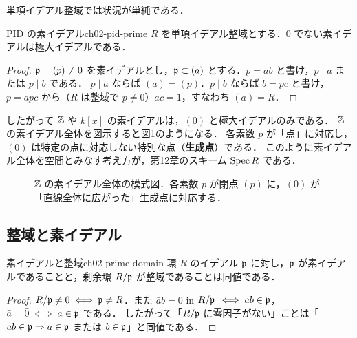 単項イデアル整域では状況が単純である．

\begin{myprop}{PID の素イデアル}{ch02-pid-prime}
$R$ を単項イデアル整域とする．$0$ でない素イデアルは極大イデアルである．
\end{myprop}

\begin{proof}
$\mathfrak{p}=(p)\ne0$ を素イデアルとし，$\mathfrak{p}\subset(a)$ とする．$p=ab$ と書け，$p\mid a$ または $p\mid b$ である．
$p\mid a$ ならば $(a)=(p)$．$p\mid b$ ならば $b=pc$ と書け，$p=apc$ から（$R$ は整域で $p\ne0$）$ac=1$，すなわち $(a)=R$．
\end{proof}

したがって $\mathbb{Z}$ や $k[x]$ の素イデアルは，$(0)$ と極大イデアルのみである．
$\mathbb{Z}$ の素イデアル全体を図示すると図\ref{fig:ch02-specz}のようになる．
各素数 $p$ が「点」に対応し，$(0)$ は特定の点に対応しない特別な点（\textbf{生成点}）である．
このように素イデアル全体を空間とみなす考え方が，第12章のスキーム $\operatorname{Spec} R$ である．

\begin{figure}[H]
\centering
{}
\caption{$\mathbb{Z}$ の素イデアル全体の模式図．各素数 $p$ が閉点 $(p)$ に，$(0)$ が「直線全体に広がった」生成点に対応する．}
\label{fig:ch02-specz}
\end{figure}

\subsection{整域と素イデアル}

\begin{mythm}{素イデアルと整域}{ch02-prime-domain}
環 $R$ のイデアル $\mathfrak{p}$ に対し，$\mathfrak{p}$ が素イデアルであることと，剰余環 $R/\mathfrak{p}$ が整域であることは同値である．
\end{mythm}

\begin{proof}
$R/\mathfrak{p}\ne0\iff\mathfrak{p}\ne R$．また $\bar a\bar b=\bar0$ in $R/\mathfrak{p}$ $\iff ab\in\mathfrak{p}$，$\bar a=\bar0\iff a\in\mathfrak{p}$ である．
したがって「$R/\mathfrak{p}$ に零因子がない」ことは「$ab\in\mathfrak{p}\Rightarrow a\in\mathfrak{p}$ または $b\in\mathfrak{p}$」と同値である．
\end{proof}


